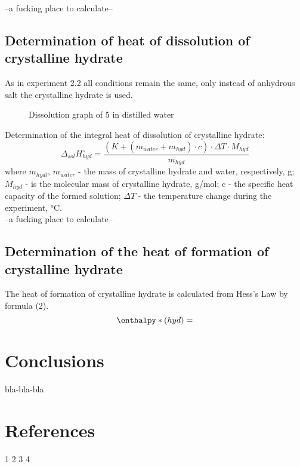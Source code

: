 \documentclass[12pt, letterpaper]{article}
\begin{document}
        --a fucking place to calculate--
       


        \subsection{Determination of heat of dissolution of crystalline hydrate}
        As in experiment 2.2 all conditions remain the same, only instead of anhydrous salt the crystalline hydrate is used.
        \begin{figure}[h]
            \centering
             \caption{Dissolution graph of 5  in distilled water}
        \end{figure}
        Determination of the integral heat of dissolution of crystalline hydrate:
         \begin{equation}
            \Delta_{sol}H^\circ_{hyd} = \frac{(K + (m_{water} + m_{hyd}) \cdot c) \cdot \Delta T \cdot M_{hyd}}{m_{hyd}}
        \end{equation}
         where $ m_{hydl}$, $m_{water}$ - the mass of crystalline hydrate  and water, respectively, g; $M_{hyd}$ - is the molecular mass of crystalline hydrate, g/mol; c - the specific heat capacity of the formed solution; $\Delta T$ - the temperature change during the experiment, °C. \\

         --a fucking place to calculate--

         \subsection{Determination of the heat of formation of crystalline hydrate}
         The heat of formation of crystalline hydrate is calculated from Hess's Law by formula (2).
         \begin{equation}
            \enthalpy*(hyd){} = 
        \end{equation}

    \section{Conclusions}
        bla-bla-bla















    
    \newpage
    \section{References}
        1
        2
        3
        4
\end{document}
